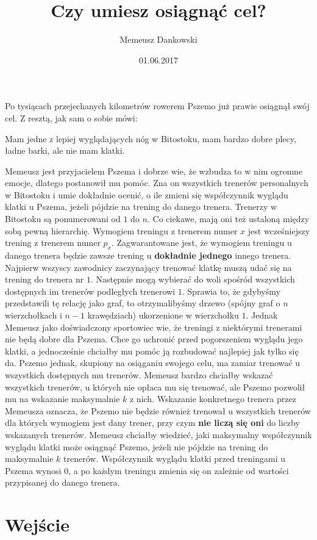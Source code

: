 \documentclass[zad,zawodnik,utf8]{sinol}
\title{Czy umiesz osiągnąć cel?}
\author{Memeusz Dankowski} %
\date{01.06.2017}
\begin{document}
\begin{tasktext}

Po tysiącach przejechanych kilometrów rowerem Pszemo już prawie osiągnął swój cel.
Z resztą, jak sam o sobie mówi:
\begingroup
    \fontsize{9pt}{12pt}\selectfont
	\begin{center}\selectfont
 		Mam jedne z lepiej wyglądających nóg w Bitostoku, mam bardzo dobre
		plecy, ładne barki, ale nie mam klatki.
	\end{center}
\endgroup	
Memeusz jest przyjacielem Pszema i dobrze wie, że wzbudza to w nim ogromne emocje, dlatego postanowił mu pomóc. Zna on wszystkich trenerów personalnych w Bitostoku i umie dokładnie ocenić, o ile zmieni się współczynnik wyglądu klatki u Pszema, jeżeli pójdzie na trening do danego trenera.
Trenerzy w Bitostoku są ponumerowani od $1$ do $n$. Co ciekawe, mają oni też ustaloną między sobą pewną hierarchię.
Wymogiem treningu z trenerem numer $x$ jest wcześniejszy trening z trenerem numer $p_x$. Zagwarantowane jest,
że wymogiem treningu u danego trenera będzie zawsze trening u \textbf{dokładnie jednego} innego trenera.
Najpierw wszyscy zawodnicy zaczynający trenować klatkę muszą udać się na trening do trenera nr $1$. Następnie mogą wybierać do woli spośród wszystkich dostępnych im trenerów podległych trenerowi $1$.
Sprawia to, że gdybyśmy przedstawili tę relację jako graf, to otrzymalibyśmy drzewo (spójny graf o $n$ wierzchołkach i $n-1$ krawędziach) ukorzenione w wierzchołku $1$.
Jednak Memeusz jako doświadczony sportowiec wie, że treningi z niektórymi trenerami nie będą dobre dla Pszema.
Chce go uchronić przed pogorszeniem wyglądu jego klatki, a jednocześnie chciałby mu pomóc ją rozbudować
najlepiej jak tylko się da. Pszemo jednak, skupiony na osiąganiu swojego celu, ma zamiar trenować u wszystkich
dostępnych mu trenerów. Memeusz bardzo chciałby wskazać wszystkich trenerów, u których nie opłaca mu się trenować, ale Pszemo pozwolił mu na wskazanie maksymalnie $k$ z nich. Wskazanie konkretnego trenera przez Memeusza oznacza, że Pszemo nie będzie również trenował u wszystkich trenerów dla których wymogiem jest dany trener, przy czym \textbf{nie liczą się oni} do liczby wskazanych trenerów. Memeusz chciałby wiedzieć, jaki maksymalny współczynnik wyglądu klatki może osiągnąć Pszemo, jeżeli nie pójdzie na trening do maksymalnie $k$ trenerów. Współczynnik wyglądu klatki przed treningami u Pszema wynosi $0$, a po każdym treningu zmienia się on zależnie od wartości przypisanej do danego trenera.


  \section{Wejście}


\end{tasktext}
\end{document}

